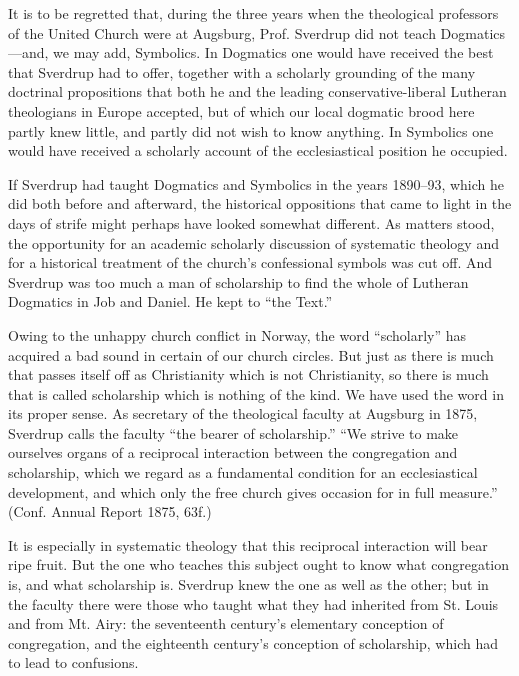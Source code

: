 It is to be regretted that, during the three years when the theological professors of the United Church were at Augsburg, Prof. Sverdrup did not teach Dogmatics—and, we may add, Symbolics. In Dogmatics one would have received the best that Sverdrup had to offer, together with a scholarly grounding of the many doctrinal propositions that both he and the leading conservative-liberal Lutheran theologians in Europe accepted, but of which our local dogmatic brood here partly knew little, and partly did not wish to know anything. In Symbolics one would have received a scholarly account of the ecclesiastical position he occupied.

If Sverdrup had taught Dogmatics and Symbolics in the years 1890–93, which he did both before and afterward, the historical oppositions that came to light in the days of strife might perhaps have looked somewhat different. As matters stood, the opportunity for an academic scholarly discussion of systematic theology and for a historical treatment of the church’s confessional symbols was cut off. And Sverdrup was too much a man of scholarship to find the whole of Lutheran Dogmatics in Job and Daniel. He kept to “the Text.”

Owing to the unhappy church conflict in Norway, the word “scholarly” has acquired a bad sound in certain of our church circles. But just as there is much that passes itself off as Christianity which is not Christianity, so there is much that is called scholarship which is nothing of the kind. We have used the word in its proper sense. As secretary of the theological faculty at Augsburg in 1875, Sverdrup calls the faculty “the bearer of scholarship.” “We strive to make ourselves organs of a reciprocal interaction between the congregation and scholarship, which we regard as a fundamental condition for an ecclesiastical development, and which only the free church gives occasion for in full measure.” (Conf. Annual Report 1875, 63f.)

It is especially in systematic theology that this reciprocal interaction will bear ripe fruit. But the one who teaches this subject ought to know what congregation is, and what scholarship is. Sverdrup knew the one as well as the other; but in the faculty there were those who taught what they had inherited from St. Louis and from Mt. Airy: the seventeenth century’s elementary conception of congregation, and the eighteenth century’s conception of scholarship, which had to lead to confusions.

